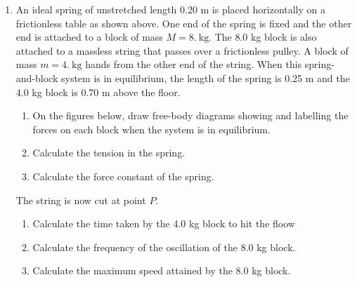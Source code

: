 \documentclass{../../../oss-apphys}
\begin{document}
\begin{enumerate}[leftmargin=15pt]
\item An ideal spring of unstretched length 0.20 m is placed horizontally on a
  frictionless table as shown above. One end of the spring is fixed and the
  other end is attached to a block of mass $M=\SI{8.}{\kilo\gram}$. The 8.0 kg
  block is also attached to a massless string that passes over a frictionless
  pulley. A block of mass $m=\SI{4.}{\kilo\gram}$ hands from the other end of
  the string. When this spring-and-block system is in equilibrium, the length
  of the spring is 0.25 m and the 4.0 kg block is 0.70 m above the floor.
  \begin{enumerate}[leftmargin=18pt,topsep=0pt,noitemsep]
  \item On the figures below, draw free-body diagrams showing and labelling
    the forces on each block when the system is in equilibrium.
  \begin{center}
    \hspace{2in}
  \end{center}
  \vspace{.3in}
  \item Calculate the tension in the spring.
  \item Calculate the force constant of the spring.
  \end{enumerate}
  The string is now cut at point $P$.
  \begin{enumerate}[leftmargin=18pt,topsep=0pt,noitemsep,resume]
  \item Calculate the time taken by the 4.0 kg block to hit the floow
  \item Calculate the frequency of the oscillation of the 8.0 kg block.
  \item Calculate the maximum speed attained by the 8.0 kg block.
  \end{enumerate}
  \newpage


\end{enumerate}
\end{document}
